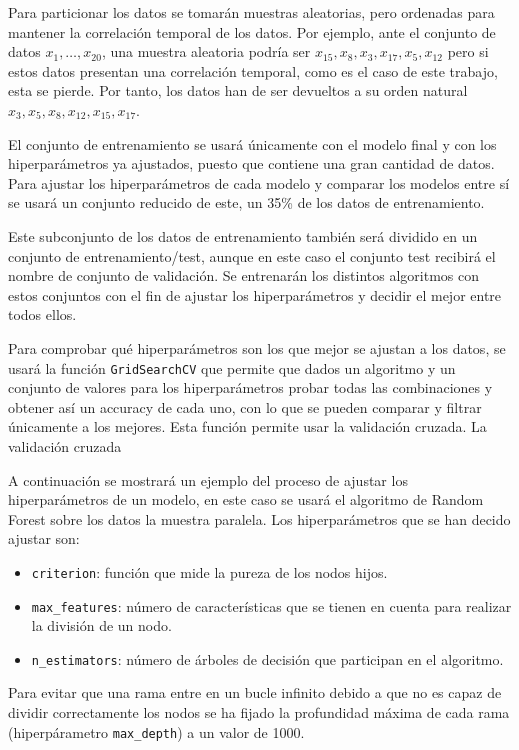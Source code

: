 Para particionar los datos se tomarán muestras aleatorias, pero ordenadas para mantener la correlación temporal de los datos. Por ejemplo, ante el conjunto de datos $x_1, \dots, x_{20}$, una muestra aleatoria podría ser $x_{15}, x_8, x_3, x_{17}, x_5, x_{12}$ pero si estos datos presentan una correlación temporal, como es el caso de este trabajo, esta se pierde. Por tanto, los datos han de ser devueltos a su orden natural $x_3, x_5, x_8, x_{12}, x_{15}, x_{17}$. 

El conjunto de entrenamiento se usará únicamente con el modelo final y con los hiperparámetros ya ajustados, puesto que contiene una gran cantidad de datos. Para ajustar los hiperparámetros de cada modelo y comparar los modelos entre sí se usará un conjunto reducido de este, un 35\% de los datos de entrenamiento.

Este subconjunto de los datos de entrenamiento también será dividido en un conjunto de entrenamiento/test, aunque en este caso el conjunto test recibirá el nombre de  conjunto de validación. Se entrenarán los distintos algoritmos con estos conjuntos con el fin de ajustar los hiperparámetros y decidir el mejor entre todos ellos.

Para comprobar qué hiperparámetros son los que mejor se ajustan a los datos, se usará la función \texttt{GridSearchCV} \cite{scikitgrid} que permite que dados un algoritmo y un conjunto de valores para los hiperparámetros probar todas las combinaciones y obtener así un accuracy de cada uno, con lo que se pueden comparar y filtrar únicamente a los mejores. Esta función permite usar la validación cruzada. La validación cruzada 

A continuación se mostrará un ejemplo del proceso de ajustar los hiperparámetros de un modelo, en este caso se usará el algoritmo de Random Forest sobre los datos la muestra paralela. Los hiperparámetros que se han decido ajustar son:
\begin{itemize}
    \item \texttt{criterion}: función que mide la pureza de los nodos hijos.
    \item \texttt{max\_features}: número de características que se tienen en cuenta para realizar la división de un nodo.
    \item \texttt{n\_estimators}: número de árboles de decisión que participan en el algoritmo.
\end{itemize}

Para evitar que una rama entre en un bucle infinito debido a que no es capaz de dividir correctamente los nodos se ha fijado la profundidad máxima de cada rama (hiperpárametro \texttt{max\_depth}) a un valor de 1000. 

